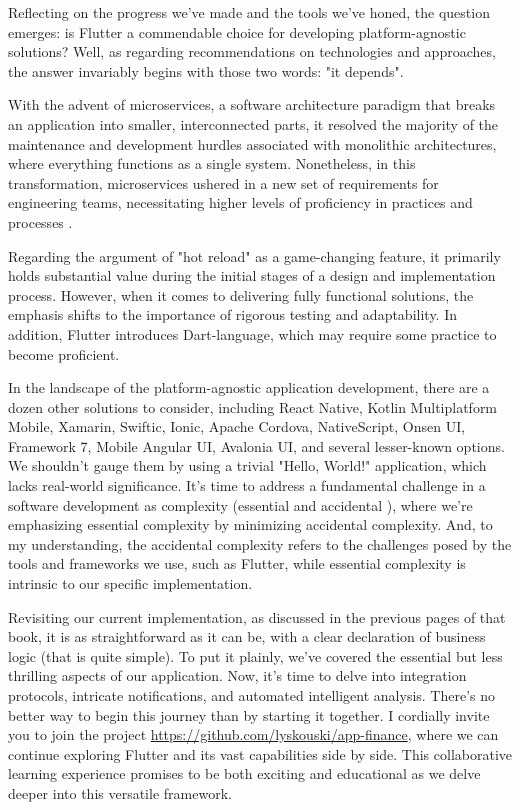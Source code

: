 
Reflecting on the progress we've made and the tools we've honed, the question emerges: is Flutter a commendable 
choice for developing platform-agnostic solutions? Well, as regarding recommendations on technologies and approaches, 
the answer invariably begins with those two words: "it depends".

With the advent of microservices, a software architecture paradigm that breaks an application into smaller, 
interconnected parts, it resolved the majority of the maintenance and development hurdles associated with monolithic 
architectures, where everything functions as a single system. Nonetheless, in this transformation, microservices 
ushered in a new set of requirements for engineering teams, necessitating higher levels of proficiency in practices 
and processes \cite{Mugr23}.

Regarding the argument of "hot reload" as a game-changing feature, it primarily holds substantial value during the 
initial stages of a design and implementation process. However, when it comes to delivering fully functional solutions, 
the emphasis shifts to the importance of rigorous testing and adaptability. In addition, Flutter introduces 
Dart-language, which may require some practice to become proficient.

In the landscape of the platform-agnostic application development, there are a dozen other solutions to consider, 
including React Native, Kotlin Multiplatform Mobile, Xamarin, Swiftic, Ionic, Apache Cordova, NativeScript, Onsen UI, 
Framework 7, Mobile Angular UI, Avalonia UI, and several lesser-known options. We shouldn't gauge them by using a 
trivial "Hello, World!" application, which lacks real-world significance. It's time to address a fundamental challenge 
in a software development as complexity (essential and accidental \cite{Broo87}), where we're emphasizing essential 
complexity by minimizing accidental complexity. And, to my understanding, the accidental complexity refers to the 
challenges posed by the tools and frameworks we use, such as Flutter, while essential complexity is intrinsic to our 
specific implementation.

Revisiting our current implementation, as discussed in the previous pages of that book, it is as 
straightforward as it can be, with a clear declaration of business logic (that is quite simple). To put it plainly, 
we've covered the essential but less thrilling aspects of our application. Now, it's time to delve into integration 
protocols, intricate notifications, and automated intelligent analysis. There's no better way to begin this journey 
than by starting it together. I cordially invite you to join the project 
\href{https://github.com/lyskouski/app-finance}{https://github.com/lyskouski/app-finance}, where we can continue 
exploring Flutter and its vast capabilities side by side. This collaborative learning experience promises to be both 
exciting and educational as we delve deeper into this versatile framework.
